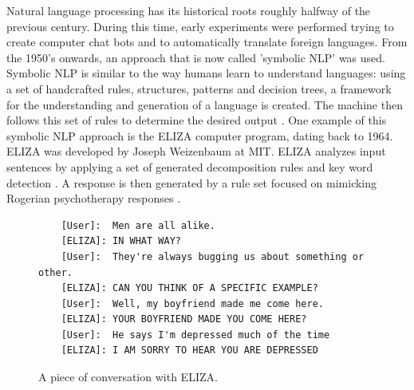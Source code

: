 \documentclass[twoside]{uva-inf-bachelor-thesis}
\begin{document}

Natural language processing has its historical roots roughly halfway of the previous century. During this time, early experiments were performed trying to create computer chat bots and to automatically translate foreign languages. From the 1950's onwards, an approach that is now called 'symbolic NLP' was used. Symbolic NLP is similar to the way humans learn to understand languages: using a set of handcrafted rules, structures, patterns and decision trees, a framework for the understanding and generation of a language is created. The machine then follows this set of rules to determine the desired output \cite{Dale00}. One example of this symbolic NLP approach is the ELIZA computer program, dating back to 1964. ELIZA was developed by Joseph Weizenbaum at MIT. ELIZA analyzes input sentences by applying a set of generated decomposition rules and key word detection \cite{weizenbaum66} \cite{Jurafsky08}. A response is then generated by a rule set focused on mimicking Rogerian psychotherapy responses \cite{Yao23}. 

\begin{figure}[h]
    \begin{verbatim}
    [User]:  Men are all alike.
    [ELIZA]: IN WHAT WAY?
    [User]:  They're always bugging us about something or other. 
    [ELIZA]: CAN YOU THINK OF A SPECIFIC EXAMPLE?
    [User]:  Well, my boyfriend made me come here.
    [ELIZA]: YOUR BOYFRIEND MADE YOU COME HERE?
    [User]:  He says I'm depressed much of the time
    [ELIZA]: I AM SORRY TO HEAR YOU ARE DEPRESSED
    \end{verbatim}
    \caption{A piece of conversation with ELIZA. \cite{weizenbaum66}}
    \label{fig:eliza-conv}
\end{figure}
\end{document}

